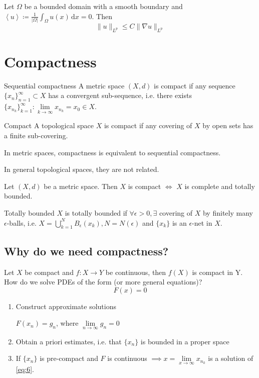 \documentclass{report}
\begin{document}
{
    Let \(\Omega\) be a bounded domain with a smooth boundary and \(\left\langle u \right\rangle \coloneqq \frac{1}{\vert \Omega \vert } \int_{\Omega} u(x) \,\mathrm{d}x = 0\). Then 
    \[
        \|u\|_{L^{p}} \leq C \|\nabla u\|_{L^{p}}
    \]   
}

\section{Compactness}
\begin{definition}{Sequential compactness}{}
    A metric space \((X, d)\) is compact if any sequence \(\{x_{n}\}_{n=1}^{\infty} \subset X\) has a convergent sub-sequence, i.e. there exists \(\{x_{n_{k}}\}_{k=1}^{\infty} \colon \lim\limits_{k \to \infty} x_{n_{k}} = x_0 \in X\).
\end{definition}

\begin{definition}{Compact}{}
    A topological space \(X\) is compact if any covering of \(X\) by open sets has a finite sub-covering.
\end{definition}

\begin{note}
    In metric spaces, compactness is equivalent to sequential compactness.

    In general topological spaces, they are not related.
\end{note}

{
    Let \((X, d)\) be a metric space. Then \(X\) is compact \(\iff\) \(X\) is complete and totally bounded.
}

\begin{definition}{Totally bounded}{}
    \(X\) is totally bounded if \(\forall \epsilon > 0, \exists\) covering of \(X\) by finitely many \(\epsilon\)-balls, i.e. \(X = \bigcup_{k=1}^{N} B_{\epsilon}(x_k), N = N(\epsilon)\) and \(\{x_k\}\) is an \(\epsilon\)-net in \(X\).
\end{definition}

\subsection*{Why do we need compactness?}
Let \(X\) be compact and \(f \colon X \to Y \) be continuous, then \(f(X)\) is compact in Y. How do we solve PDEs of the form (or more general equations)?
\begin{equation}\label{eq:6}
    F(x) = 0
\end{equation}
\begin{enumerate}
    \item Construct approximate solutions
    
    \(F(x_n) = g_n\), where \(\lim\limits_{n \to \infty} g_n = 0\)
    \item Obtain a priori estimates, i.e. that \(\{x_n\}\) is bounded in a proper space
    \item If \(\{x_n\}\) is pre-compact and \(F\) is continuous \(\implies x = \lim\limits_{x \to \infty} x_{n_{k}}\) is a solution of \ref{eq:6}.
\end{enumerate}
\end{document}
